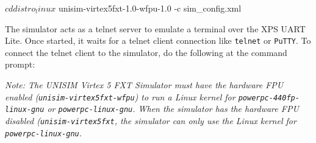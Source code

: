 \begin{script}
$ cd distro_linux
$ unisim-virtex5fxt-1.0-wfpu-1.0 -c sim_config.xml
\end{script}

The simulator acts as a telnet server to emulate a terminal over the XPS UART Lite. Once started, it waits for a telnet client connection like \texttt{telnet} or \texttt{PuTTY}.
To connect the telnet client to the simulator, do the following at the command prompt:


\textit{Note: The UNISIM Virtex 5 FXT Simulator must have the hardware FPU enabled (\texttt{unisim\--virtex5fxt\--wfpu}) to run a Linux kernel for \texttt{powerpc\--440fp\--linux\--gnu} or \texttt{powerpc\--linux\--gnu}. When the simulator has the hardware FPU disabled (\texttt{unisim\--virtex5fxt}, the simulator can only use the Linux kernel for \texttt{powerpc\--linux\--gnu}.}

